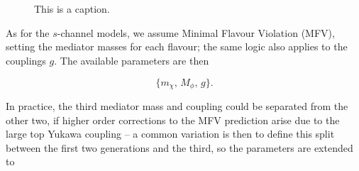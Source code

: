 \begin{figure}
  \begin{feynmandiagram}[modelTDijetD]
  \end{feynmandiagram}\\\vspace{\baselineskip}
  \begin{feynmandiagram}[modelTDijetE]
  \end{feynmandiagram}\\\vspace{\baselineskip}

\caption{This is a caption.}
\end{figure}

\vspace{5mm}

As for the $s$-channel models, we assume Minimal Flavour Violation (MFV), setting the mediator masses for each flavour; the same logic also applies to the couplings $g$. The available parameters are then

\begin{equation}
\{ m_{\chi},\, M_{\phi},\, g\}.
\end{equation}

In practice, the third mediator mass and coupling could be separated from the other two, if higher order corrections to the MFV prediction arise due to the large top Yukawa coupling -- a common variation is then to define this split between the first two generations and the third, so the parameters are extended to

